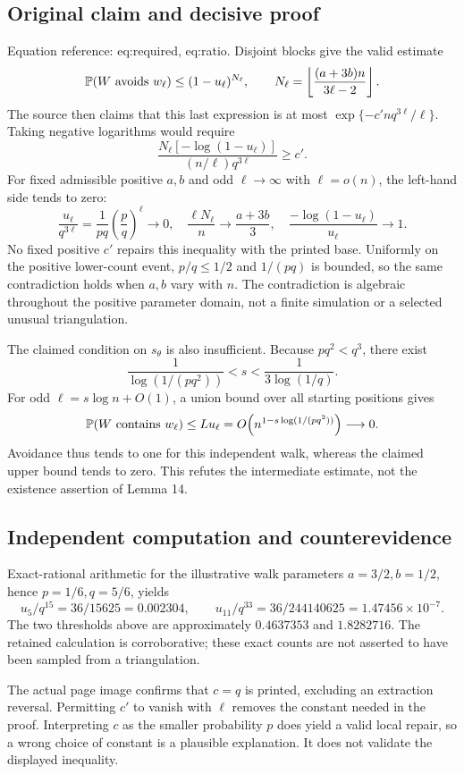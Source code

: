 \documentclass[10pt]{article}
\begin{document}
\subsection*{Original claim and decisive proof}
Equation reference: eq:required, eq:ratio. Disjoint blocks give the valid estimate \[\mathbb P(W\hbox{ avoids }w_\ell)\leq(1-u_\ell)^{N_\ell},
\qquad N_\ell=\left\lfloor\frac{(a+3b)n}{3\ell-2}\right\rfloor.\] The source then claims that this last expression is at most \(\exp\{-c'nq^{3\ell}/\ell\}\). Taking negative logarithms would require \[
\frac{N_\ell[-\log(1-u_\ell)]}{(n/\ell)q^{3\ell}}\geq c'.\] For fixed admissible positive \(a,b\) and odd \(\ell\to\infty\) with \(\ell=o(n)\), the left-hand side tends to zero: \[
\frac{u_\ell}{q^{3\ell}}
=\frac1{pq}\left(\frac pq\right)^\ell\longrightarrow0,\quad
\frac{\ell N_\ell}{n}\longrightarrow\frac{a+3b}{3},\quad
\frac{-\log(1-u_\ell)}{u_\ell}\longrightarrow1.\] No fixed positive \(c'\) repairs this inequality with the printed base. Uniformly on the positive lower-count event, \(p/q\leq1/2\) and \(1/(pq)\) is bounded, so the same contradiction holds when \(a,b\) vary with \(n\). The contradiction is algebraic throughout the positive parameter domain, not a finite simulation or a selected unusual triangulation.\par
The claimed condition on \(s_\theta\) is also insufficient. Because \(pq^2<q^3\), there exist \[\frac1{\log(1/(pq^2))}<s<\frac1{3\log(1/q)}.\] For odd \(\ell=s\log n+O(1)\), a union bound over all starting positions gives \[\mathbb P(W\hbox{ contains }w_\ell)\leq Lu_\ell
=O\!\left(n^{1-s\log(1/(pq^2))}\right)\longrightarrow0.\] Avoidance thus tends to one for this independent walk, whereas the claimed upper bound tends to zero. This refutes the intermediate estimate, not the existence assertion of Lemma 14.\par
\subsection*{Independent computation and counterevidence}
Exact-rational arithmetic for the illustrative walk parameters \(a=3/2,b=1/2\), hence \(p=1/6,q=5/6\), yields \[u_5/q^{15}=36/15625=0.002304,\qquad
u_{11}/q^{33}=36/244140625=1.47456\times10^{-7}.\] The two thresholds above are approximately \(0.4637353\) and \(1.8282716\). The retained calculation is corroborative; these exact counts are not asserted to have been sampled from a triangulation.\par
The actual page image confirms that \(c=q\) is printed, excluding an extraction reversal. Permitting \(c'\) to vanish with \(\ell\) removes the constant needed in the proof. Interpreting \(c\) as the smaller probability \(p\) does yield a valid local repair, so a wrong choice of constant is a plausible explanation. It does not validate the displayed inequality.\par
\end{document}
